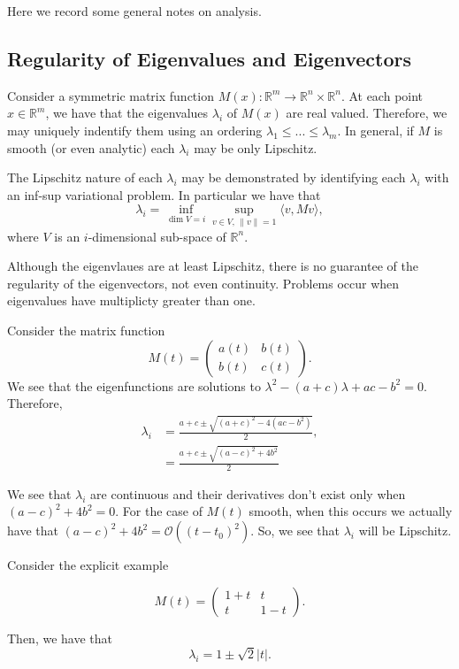 Here we record some general notes on analysis.

\subsection{Regularity of Eigenvalues and Eigenvectors}

Consider a symmetric matrix function $M(x): \mathbb R^m \to \mathbb R^n\times \mathbb R^n$. At each point $x\in \mathbb R^m$, we have that the eigenvalues $\lambda_i$ of $M(x)$ are real valued. Therefore, we may uniquely indentify them using an ordering $\lambda_1 \leq ... \leq \lambda_m$. In general, if $M$ is smooth (or even analytic) each $\lambda_i$ may be only Lipschitz.

The Lipschitz nature of each $\lambda_i$ may be demonstrated by identifying each $\lambda_i$ with an inf-sup variational problem. In particular we have that
\begin{equation}
\lambda_i = \inf\limits_{\dim V = i} \sup\limits_{v\in V, \, \|v\| = 1} \langle v, Mv\rangle,
\end{equation}
where $V$ is an $i$-dimensional sub-space of $\mathbb R^n$.

Although the eigenvlaues are at least Lipschitz, there is no guarantee of the regularity of the eigenvectors, not even continuity. Problems occur when eigenvalues have multiplicty greater than one.

Consider the matrix function
\begin{equation}
M(t) = \begin{pmatrix}
a(t) & b(t)\\
b(t) & c(t)
\end{pmatrix}.
\end{equation}
We see that the eigenfunctions are solutions to $\lambda^2 - (a + c)\lambda + ac-b^2 = 0$. Therefore,
\begin{align}
\lambda_i & = \frac{a+c \pm \sqrt{(a+c)^2 - 4(ac - b^2)}}{2},\\
& = \frac{a+c \pm \sqrt{(a-c)^2 + 4 b^2}}{2}
\end{align}

We see that $\lambda_i$ are continuous and their derivatives don't exist only when $(a-c)^2 + 4b^2 = 0.$ For the case of $M(t)$ smooth, when this occurs we actually have that $(a-c)^2 + 4b^2 = \mathcal O((t-t_0)^2).$ So, we see that $\lambda_i$ will be Lipschitz.

\begin{example}
Consider the explicit example

\begin{equation}
M(t) = \begin{pmatrix}
1 + t & t\\
t & 1-t
\end{pmatrix}.
\end{equation}

Then, we have that
\begin{equation}
\lambda_i = 1 \pm \sqrt{2}|t|.
\end{equation}
\end{example}

